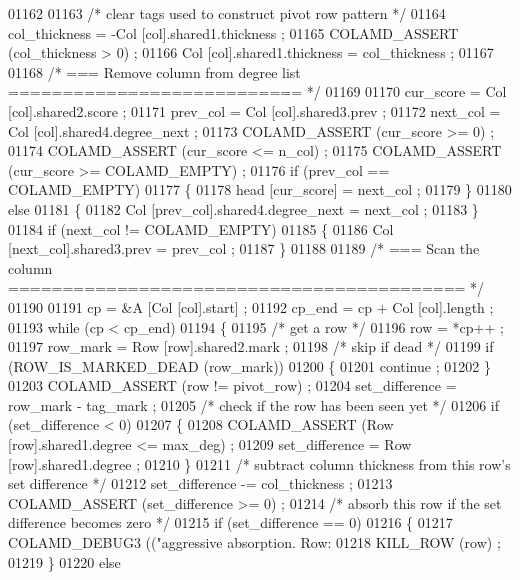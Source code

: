 \begin{DoxyCode}
{{{{{{{{{{{{{{{{{{{{{{{01162 
01163       \textcolor{comment}{/* clear tags used to construct pivot row pattern */}
01164       col\_thickness = -Col [col].shared1.thickness ;
01165       COLAMD\_ASSERT (col\_thickness > 0) ;
01166       Col [col].shared1.thickness = col\_thickness ;
01167 
01168       \textcolor{comment}{/* === Remove column from degree list =========================== */}
01169 
01170       cur\_score = Col [col].shared2.score ;
01171       prev\_col = Col [col].shared3.prev ;
01172       next\_col = Col [col].shared4.degree\_next ;
01173       COLAMD\_ASSERT (cur\_score >= 0) ;
01174       COLAMD\_ASSERT (cur\_score <= n\_col) ;
01175       COLAMD\_ASSERT (cur\_score >= COLAMD\_EMPTY) ;
01176       \textcolor{keywordflow}{if} (prev\_col == COLAMD\_EMPTY)
01177       \{
01178     head [cur\_score] = next\_col ;
01179       \}
01180       \textcolor{keywordflow}{else}
01181       \{
01182     Col [prev\_col].shared4.degree\_next = next\_col ;
01183       \}
01184       \textcolor{keywordflow}{if} (next\_col != COLAMD\_EMPTY)
01185       \{
01186     Col [next\_col].shared3.prev = prev\_col ;
01187       \}
01188 
01189       \textcolor{comment}{/* === Scan the column ========================================== */}
01190 
01191       cp = &A [Col [col].start] ;
01192       cp\_end = cp + Col [col].length ;
01193       \textcolor{keywordflow}{while} (cp < cp\_end)
01194       \{
01195     \textcolor{comment}{/* get a row */}
01196     row = *cp++ ;
01197     row\_mark = Row [row].shared2.mark ;
01198     \textcolor{comment}{/* skip if dead */}
01199     \textcolor{keywordflow}{if} (ROW\_IS\_MARKED\_DEAD (row\_mark))
01200     \{
01201       continue ;
01202     \}
01203     COLAMD\_ASSERT (row != pivot\_row) ;
01204     set\_difference = row\_mark - tag\_mark ;
01205     \textcolor{comment}{/* check if the row has been seen yet */}
01206     \textcolor{keywordflow}{if} (set\_difference < 0)
01207     \{
01208       COLAMD\_ASSERT (Row [row].shared1.degree <= max\_deg) ;
01209       set\_difference = Row [row].shared1.degree ;
01210     \}
01211     \textcolor{comment}{/* subtract column thickness from this row's set difference */}
01212     set\_difference -= col\_thickness ;
01213     COLAMD\_ASSERT (set\_difference >= 0) ;
01214     \textcolor{comment}{/* absorb this row if the set difference becomes zero */}
01215     \textcolor{keywordflow}{if} (set\_difference == 0)
01216     \{
01217       COLAMD\_DEBUG3 ((\textcolor{stringliteral}{"aggressive absorption. Row: %
01218       KILL\_ROW (row) ;
01219     \}
01220     \textcolor{keywordflow}{else}
}}}}}}}}}}}}}}}}}}}}}}}}
\end{DoxyCode}
